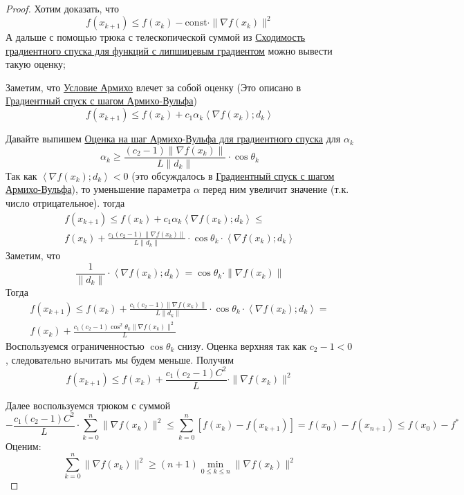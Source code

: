 \begin{proof}
  Хотим доказать, что
  \[
  f(x_{k+1}) \le f(x_k) - \mathrm{const} \cdot \|\nabla f(x_k)\|^2
  \]
  А дальше с помощью трюка с телескопической суммой из \hyperref[note:C3B64D64-D35B-42AC-B683-6736227CBBBC]{Сходимость градиентного спуска для функций с липшицевым градиентом} можно вывести такую оценку;

  Заметим, что \hyperref[note:15611E05-13FC-4FB0-AE00-A4BB857A29E6]{Условие Армихо} влечет за собой оценку (Это описано в \hyperref[note:DF0CC2BA-9234-47D3-8988-7A1DAFC9B114]{Градиентный спуск с шагом Армихо-Вульфа})
  \[
  f(x_{k+1}) \le f(x_k) + c_1\alpha_k \left\langle \nabla f(x_k);d_k \right\rangle
  \]

  Давайте выпишем \hyperref[note:93FC9CC4-79FA-4CEA-9B10-9DBFB2C07850]{Оценка на шаг Армихо-Вульфа для градиентного спуска} для $\alpha_k$
  \[
  \alpha_k \ge \frac{(c_2-1)\|\nabla f(x_k)\|}{L \|d_k\|} \cdot \cos \theta_k
  \]
  Так как $\left\langle \nabla f(x_k);d_k \right\rangle < 0$ (это обсуждалось в \hyperref[note:DF0CC2BA-9234-47D3-8988-7A1DAFC9B114]{Градиентный спуск с шагом Армихо-Вульфа}), то
  уменьшение параметра $\alpha$ перед ним увеличит значение (т.к. число отрицательное).
  тогда
  \begin{multline*}
  f(x_{k+1}) \le f(x_k) + c_1\alpha_k \left\langle \nabla f(x_k);d_k \right\rangle \le \\
  f(x_k) + \frac{c_1(c_2-1)\|\nabla f(x_k)\|}{L \|d_k\|} \cdot \cos \theta_k \cdot \left\langle \nabla f(x_k); d_k \right\rangle
  \end{multline*}
  Заметим, что
  \[
  \frac{1}{\|d_k\|} \cdot \left\langle \nabla f(x_k); d_k \right\rangle = \cos \theta_k \cdot \|\nabla f(x_k)\|
  \]
  Тогда
  \begin{multline*}
  f(x_{k+1}) \le
  f(x_k) + \frac{c_1(c_2-1)\|\nabla f(x_k)\|}{L \|d_k\|} \cdot \cos \theta_k \cdot \left\langle \nabla f(x_k); d_k \right\rangle = \\
  f(x_k) + \frac{c_1(c_2-1)\cos^2 \theta_k \|\nabla f(x_k)\|^2}{L}
  \end{multline*}
  Воспользуемся ограниченностью $\cos \theta_k$ снизу. Оценка верхняя так как $c_2 - 1 < 0$, следовательно вычитать мы будем меньше. Получим
  \[
  f(x_{k+1}) \le f(x_k) + \frac{c_1(c_2-1)C^2}{L} \cdot \| \nabla f(x_k)\|^2
  \]

  Далее воспользуемся трюком с суммой
  \[- \frac{c_1(c_2-1)C^2}{L} \cdot \sum\limits_{k=0}^n \| \nabla f(x_k)\|^2 \le \sum\limits_{k=0}^n [f(x_k)-f(x_{k+1})] = f(x_0) - f(x_{n+1}) \le f(x_0) - f^{*}
  \]
  Оценим:
  \[
  \sum\limits_{k=0}^n \|\nabla f(x_k)\|^2 \ge (n+1) \min_{0\le k\le n} \|\nabla f(x_k)\|^2
  \]


\end{proof}
